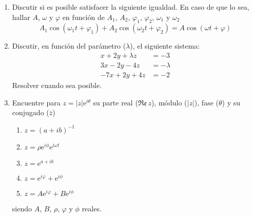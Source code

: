 \documentclass[11pt,spanish,a4paper]{article}
\begin{document}
\begin{enumerate}
\item Discutir si es posible satisfacer la siguiente igualdad. En caso de que lo sea, hallar \(A \), \(\omega \) y \(\varphi \) en función de \(A_{1} \), \(A_{2} \), \(\varphi_{1} \),  \(\varphi_{2} \), \(\omega_1 \) y \(\omega_2 \)
\[
A_{1}\cos\left(\omega_1 t+\varphi_{1}\right)+A_{2}\cos\left(\omega_2 t+ \varphi_{2}\right)= A\cos\left(\omega t+ \varphi\right)
\]

\item Discutir, en función del parámetro (\(\lambda \)), el siguiente sistema:
\begin{align*}
x+ 2y+ \lambda z & =-3\\
3x- 2y- 4z & = -\lambda\\
-7x+ 2y+ 4z & = -2
\end{align*}
Resolver cuando sea posible.

\item Encuentre para \(z= \left| z \right|\mathrm{e}^{i \theta} \) su parte real (\( \Re\mathfrak{e}\, z\)), módulo (\( \left| z \right| \)), fase (\( \theta \)) y su conjugado (\( \bar{z} \))
\begin{enumerate}
	\item \(z=(a+ i b)^{-1} \)
	\item \(z=\rho \mathrm{e}^{i \phi} \mathrm{e}^{i \omega t} \)
	\item \(z= \mathrm{e}^{a+ i b} \)
	\item \(z= \mathrm{e}^{i \varphi}+ \mathrm{e}^{i \phi} \)
	\item \(z= A \mathrm{e}^{i \varphi}+ B \mathrm{e}^{i \phi} \)
\end{enumerate}
siendo \(A \), \(B \), \(\rho \), \(\varphi \) y \(\phi \) reales.

\end{enumerate}
\end{document}
